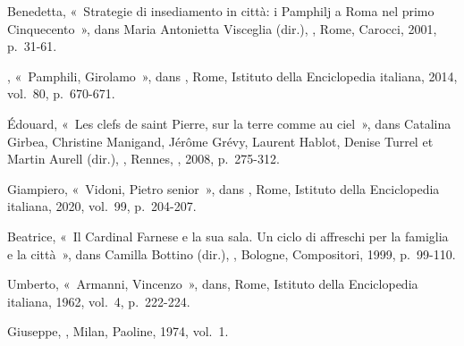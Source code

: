 \begin{teiElement}[name={TEI},change={commons\_edition}]
\begin{teiElement}[name={text},type={book},xmlid={book}]
\begin{teiElement}[name={group},type={book},xmlid={book-001}]
\begin{teiElement}[name={group},type={bibliography},data-page-title={Sources et bibliographie},data-include-href={Ch14\_Source\_bibliographie.xml},xmlid={bibliography-001}]
\begin{teiElement}[name={body}]
\begin{teiDiv}[type={section1},xmlid={div18}]
\begin{teiDiv}[type={section2},xmlid={div19}]
\begin{teiBibl}[xmlid={bibl-340}]
 Benedetta, « Strategie di insediamento in città: i Pamphilj a Roma nel primo Cinquecento », dans Maria Antonietta Visceglia (dir.), , Rome, Carocci, 2001, p. 31-61.
\end{teiBibl}
              \begin{teiBibl}[xmlid={bibl-341}]
, « Pamphili, Girolamo », dans , Rome, Istituto della Enciclopedia italiana, 2014, vol. 80, p. 670-671.
\end{teiBibl}
              \begin{teiBibl}[xmlid={bibl-342}]
 Édouard, « Les clefs de saint Pierre, sur la terre comme au ciel », dans Catalina Girbea, Christine Manigand, Jérôme Grévy, Laurent Hablot, Denise Turrel et Martin Aurell (dir.), , Rennes, , 2008, p. 275-312.
\end{teiBibl}
              \begin{teiBibl}[xmlid={bibl-343}]
 Giampiero, « Vidoni, Pietro senior », dans , Rome, Istituto della Enciclopedia italiana, 2020, vol. 99, p. 204-207.
\end{teiBibl}
              \begin{teiBibl}[xmlid={bibl-344}]
 Beatrice, « Il Cardinal Farnese e la sua sala. Un ciclo di affreschi per la famiglia e la città », dans Camilla Bottino (dir.), , Bologne, Compositori, 1999, p. 99-110.
\end{teiBibl}
              \begin{teiBibl}[xmlid={bibl-345}]
 Umberto, « Armanni, Vincenzo », dans, Rome, Istituto della Enciclopedia italiana, 1962, vol. 4, p. 222-224.
\end{teiBibl}
              \begin{teiBibl}[xmlid={bibl-346}]
 Giuseppe, , Milan, Paoline, 1974, vol. 1.
\end{teiBibl}
              \begin{teiBibl}[xmlid={bibl-347}]

\end{teiBibl}
\end{teiDiv}
\end{teiDiv}
\end{teiElement}
\end{teiElement}
\end{teiElement}
\end{teiElement}
\end{teiElement}
